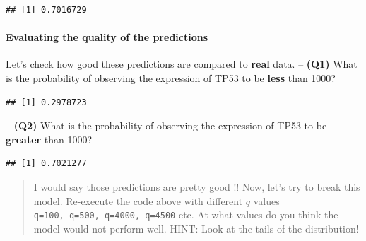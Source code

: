 \documentclass[
]{book}
\newenvironment{Shaded}{\begin{snugshade}}{\end{snugshade}}
\newcommand{\DecValTok}[1]{\textcolor[rgb]{0.00,0.00,0.81}{#1}}
\newcommand{\FunctionTok}[1]{\textcolor[rgb]{0.13,0.29,0.53}{\textbf{#1}}}
\newcommand{\NormalTok}[1]{#1}
\newcommand{\SpecialCharTok}[1]{\textcolor[rgb]{0.81,0.36,0.00}{\textbf{#1}}}
\begin{document}
\begin{verbatim}
## [1] 0.7016729
\end{verbatim}

\hypertarget{evaluating-the-quality-of-the-predictions}{%
\paragraph{Evaluating the quality of the predictions}\label{evaluating-the-quality-of-the-predictions}}

Let's check how good these predictions are compared to \textbf{real} data.
-- \textbf{(Q1)} What is the probability of observing the expression of TP53 to be \textbf{less} than 1000?

\begin{Shaded}
\end{Shaded}

\begin{verbatim}
## [1] 0.2978723
\end{verbatim}

-- \textbf{(Q2)} What is the probability of observing the expression of TP53 to be \textbf{greater} than 1000?

\begin{Shaded}
\end{Shaded}

\begin{verbatim}
## [1] 0.7021277
\end{verbatim}

\begin{quote}
I would say those predictions are pretty good !! Now, let's try to break this model. Re-execute the code above with different \(q\) values \texttt{q=100,\ q=500,\ q=4000,\ q=4500} etc. At what values do you think the model would not perform well. HINT: Look at the tails of the distribution!
\end{quote}
\end{document}
